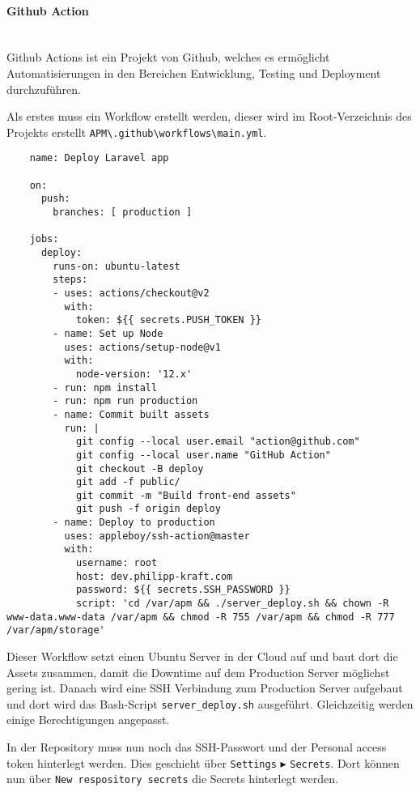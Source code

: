 \paragraph{Github Action}\mbox{}\\
Github Actions ist ein Projekt von Github, welches es ermöglicht Automatisierungen in den Bereichen Entwicklung, Testing und Deployment durchzuführen.

Als erstes muss ein Workflow erstellt werden, dieser wird im Root-Verzeichnis des Projekts erstellt \verb|APM\.github\workflows\main.yml|.

\begin{longlisting}
  \begin{verbatim}
    name: Deploy Laravel app

    on:
      push:
        branches: [ production ]
    
    jobs:
      deploy:
        runs-on: ubuntu-latest
        steps:
        - uses: actions/checkout@v2
          with:
            token: ${{ secrets.PUSH_TOKEN }}
        - name: Set up Node
          uses: actions/setup-node@v1
          with:
            node-version: '12.x'
        - run: npm install
        - run: npm run production
        - name: Commit built assets
          run: |
            git config --local user.email "action@github.com"
            git config --local user.name "GitHub Action"
            git checkout -B deploy
            git add -f public/
            git commit -m "Build front-end assets"
            git push -f origin deploy
        - name: Deploy to production
          uses: appleboy/ssh-action@master
          with:
            username: root
            host: dev.philipp-kraft.com
            password: ${{ secrets.SSH_PASSWORD }}
            script: 'cd /var/apm && ./server_deploy.sh && chown -R www-data.www-data /var/apm && chmod -R 755 /var/apm && chmod -R 777 /var/apm/storage' 
  \end{verbatim}
  \caption{main.yml}
\end{longlisting}

Dieser Workflow setzt einen Ubuntu Server in der Cloud auf und baut dort die
Assets zusammen, damit die Downtime auf dem Production Server möglichst gering
ist. Danach wird eine SSH Verbindung zum Production Server aufgebaut und dort
wird das Bash-Script \verb|server_deploy.sh| ausgeführt. Gleichzeitig werden
einige Berechtigungen angepasst.

In der Repository muss nun noch das SSH-Passwort und der Personal access token
hinterlegt werden. Dies geschieht über \verb|Settings| $\blacktriangleright$ \verb|Secrets|. Dort
können nun über \verb|New respository secrets| die Secrets hinterlegt werden.

